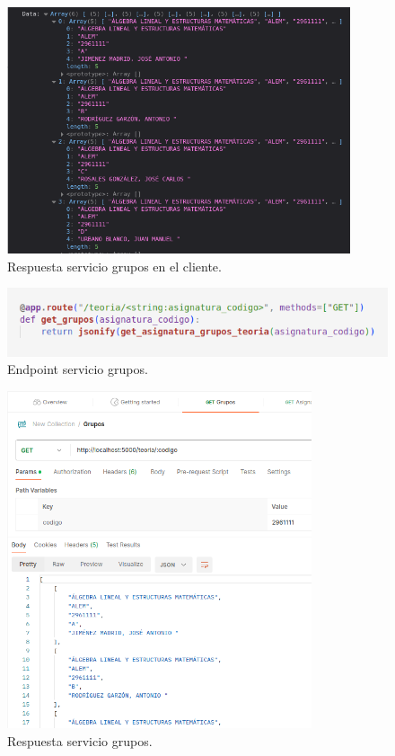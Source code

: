 \begin{figure}[H]
    \centering
    \includegraphics[width=0.9\textwidth]{./imagenes/get_grupos_teoria_respuesta_cliente.png}
    \caption{Respuesta servicio grupos en el cliente.}
    \label{fig:get_grupos_respuesta_cliente}
\end{figure}

\begin{figure}[H]
    \centering
    \includegraphics[width=1\textwidth]{./imagenes/get_grupos_teoria_endpoint.png}
    \caption{Endpoint servicio grupos.}
    \label{fig:get_grupos_teoria_endpoint}
\end{figure}

\begin{figure}[H]
    \centering
    \includegraphics[width=0.8\textwidth]{./imagenes/get_grupos_teoria_respuesta.png}
    \caption{Respuesta servicio grupos.}
    \label{fig:get_grupos_teoria_respuesta}
\end{figure}


